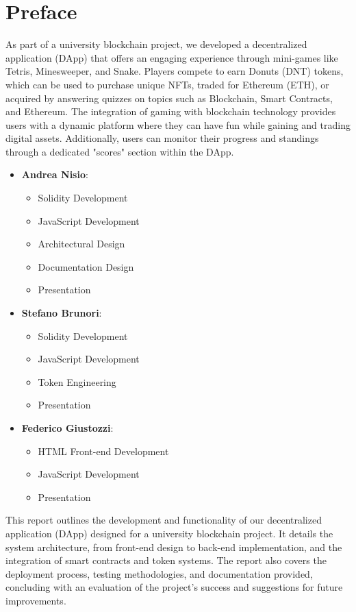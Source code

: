 \documentclass[main.tex]{subfiles}
\begin{document}
\section{Preface}\label{sec:introduction}
As part of a university blockchain project, we developed a decentralized application (DApp) that offers an engaging experience through mini-games like Tetris, Minesweeper, and Snake. Players compete to earn Donuts (DNT) tokens, which can be used to purchase unique NFTs, traded for Ethereum (ETH), or acquired by answering quizzes on topics such as Blockchain, Smart Contracts, and Ethereum. The integration of gaming with blockchain technology provides users with a dynamic platform where they can have fun while gaining and trading digital assets. Additionally, users can monitor their progress and standings through a dedicated "scores" section within the DApp.

\begin{itemize}
    \item \textbf{Andrea Nisio}: 
    \begin{itemize}
        \item Solidity Development
        \item JavaScript Development
        \item Architectural Design
        \item Documentation Design
        \item Presentation
    \end{itemize}
    
    \item \textbf{Stefano Brunori}: 
    \begin{itemize}
        \item Solidity Development
        \item JavaScript Development
        \item Token Engineering
        \item Presentation
    \end{itemize}
    
    \item \textbf{Federico Giustozzi}: 
    \begin{itemize}
        \item HTML Front-end Development
        \item JavaScript Development
        \item Presentation
    \end{itemize}
\end{itemize}

This report outlines the development and functionality of our decentralized application (DApp) designed for a university blockchain project. It details the system architecture, from front-end design to back-end implementation, and the integration of smart contracts and token systems. The report also covers the deployment process, testing methodologies, and documentation provided, concluding with an evaluation of the project's success and suggestions for future improvements.
\end{document}
